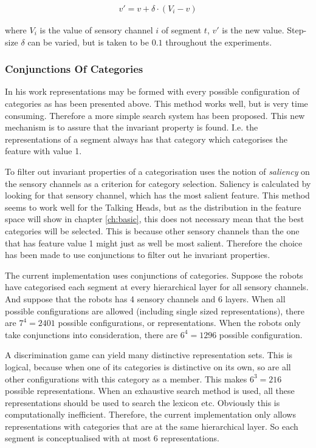\begin{eqnarray}
v'=v+\delta \cdot (V_i-v)
\label{e:cm:shift}
\end{eqnarray}

\p
where $V_i$ is the value of sensory channel $i$ of segment $t$, $v'$ is the new value. Step-size $\delta$ can be varied, but is taken to be $0.1$ throughout the experiments.

\subsubsection{Conjunctions Of Categories}

In his work  representations may be formed with every possible configuration of categories as has been presented above. This method works well, but is very time consuming. Therefore a more simple search system has been proposed. This new mechanism is to assure that the invariant property is found. I.e. the representations of a segment always has that category which categorises the feature with value 1.

To filter out invariant properties of a categorisation  uses the notion of {\em saliency} on the sensory channels as a criterion for category selection. Saliency is calculated by looking for that sensory channel, which has the most salient feature. This method seems to work well for the Talking Heads, but as the distribution in the feature space will show in chapter \ref{ch:basic}, this does not necessary mean that the best categories will be selected. This is because other sensory channels than the one that has feature value 1 might just as well be most salient. Therefore the choice has been made to use conjunctions to filter out he invariant properties.

\p
The current implementation uses conjunctions of categories. Suppose the robots have categorised each segment at every hierarchical layer for all sensory channels. And suppose that the robots has 4 sensory channels and 6 layers. When all possible configurations are allowed (including single sized representations), there are $7^4=2401$ possible configurations, or representations. When the robots only take conjunctions into consideration, there are $6^4=1296$ possible configuration. 

A discrimination game can yield many distinctive representation sets. This is logical, because when one of its categories is distinctive on its own, so are all other configurations with this category as a member. This makes $6^3=216$ possible representations. When an exhaustive search method is used, all these representations should be used to search the lexicon etc. Obviously this is computationally inefficient. Therefore, the current implementation only allows representations with categories that are at the same hierarchical layer. So each segment is conceptualised with at most 6 representations.

